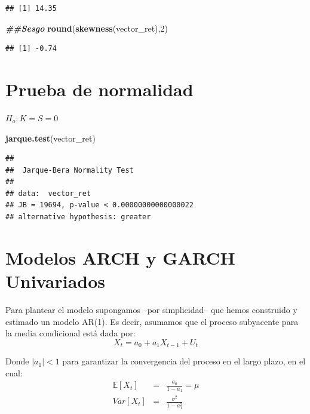 \documentclass[
]{book}
\newenvironment{Shaded}{\begin{snugshade}}{\end{snugshade}}
\newcommand{\DecValTok}[1]{\textcolor[rgb]{0.00,0.00,0.81}{#1}}
\newcommand{\DocumentationTok}[1]{\textcolor[rgb]{0.56,0.35,0.01}{\textbf{\textit{#1}}}}
\newcommand{\FunctionTok}[1]{\textcolor[rgb]{0.13,0.29,0.53}{\textbf{#1}}}
\newcommand{\NormalTok}[1]{#1}
\begin{document}
\begin{verbatim}
## [1] 14.35
\end{verbatim}

\begin{Shaded}
\begin{Highlighting}[]
\DocumentationTok{\#\#Sesgo}
\FunctionTok{round}\NormalTok{(}\FunctionTok{skewness}\NormalTok{(vector\_ret),}\DecValTok{2}\NormalTok{)}
\end{Highlighting}
\end{Shaded}

\begin{verbatim}
## [1] -0.74
\end{verbatim}

\hypertarget{prueba-de-normalidad}{%
\section{Prueba de normalidad}\label{prueba-de-normalidad}}

\(H_o: K=S=0\)

\begin{Shaded}
\begin{Highlighting}[]
\FunctionTok{jarque.test}\NormalTok{(vector\_ret)}
\end{Highlighting}
\end{Shaded}

\begin{verbatim}
## 
##  Jarque-Bera Normality Test
## 
## data:  vector_ret
## JB = 19694, p-value < 0.00000000000000022
## alternative hypothesis: greater
\end{verbatim}

\hypertarget{modelos-arch-y-garch-univariados}{%
\section{Modelos ARCH y GARCH Univariados}\label{modelos-arch-y-garch-univariados}}

Para plantear el modelo supongamos --por simplicidad-- que hemos construido y estimado un modelo AR(1). Es decir, asumamos que el proceso subyacente para la media condicional está dada por:
\begin{equation}
    X_t = a_0 + a_1 X_{t-1} + U_t
\end{equation}

Donde \(| a_1 |< 1\) para garantizar la convergencia del proceso en el largo plazo, en el cual:
\begin{eqnarray*}
    \mathbb{E}[X_t] & = & \frac{a_0 }{1 - a_1} = \mu \\
    Var[X_t] & = & \frac{\sigma^2}{1 - a_1^2}
\end{eqnarray*}
\end{document}
